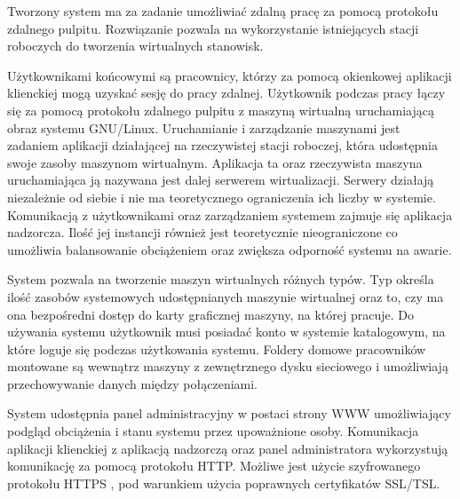 \documentclass[../wstep.tex]{subfiles}
\begin{document}
Tworzony system ma za zadanie umożliwiać zdalną pracę za pomocą protokołu zdalnego pulpitu. Rozwiązanie pozwala na wykorzystanie istniejących stacji roboczych do tworzenia wirtualnych stanowisk.

Użytkownikami końcowymi są pracownicy, którzy za pomocą okienkowej aplikacji klienckiej mogą uzyskać sesję do pracy zdalnej. Użytkownik podczas pracy łączy się za pomocą protokołu zdalnego pulpitu z maszyną wirtualną uruchamiającą obraz systemu GNU/Linux. Uruchamianie i zarządzanie maszynami jest zadaniem aplikacji działającej na rzeczywistej stacji roboczej, która udostępnia swoje zasoby maszynom wirtualnym. Aplikacja ta oraz rzeczywista maszyna uruchamiająca ją nazywana jest dalej serwerem wirtualizacji. Serwery działają niezależnie od siebie i nie ma teoretycznego ograniczenia ich liczby w systemie. Komunikacją z użytkownikami oraz zarządzaniem systemem zajmuje się aplikacja nadzorcza. Ilość jej instancji również jest teoretycznie nieograniczone co umożliwia balansowanie obciążeniem oraz zwiększa odporność systemu na awarie.

System pozwala na tworzenie maszyn wirtualnych różnych typów. Typ określa ilość zasobów systemowych udostępnianych maszynie wirtualnej oraz to, czy ma ona bezpośredni dostęp do karty graficznej maszyny, na której pracuje. Do używania systemu użytkownik musi posiadać konto w systemie katalogowym, na które loguje się podczas użytkowania systemu. Foldery domowe pracowników montowane są wewnątrz maszyny z zewnętrznego dysku sieciowego i umożliwiają przechowywanie danych między połączeniami.

System udostępnia panel administracyjny w postaci strony WWW umożliwiający podgląd obciążenia i stanu systemu przez upoważnione osoby. Komunikacja aplikacji klienckiej z aplikacją nadzorczą oraz panel administratora wykorzystują komunikację za pomocą protokołu HTTP. Możliwe jest użycie szyfrowanego protokołu HTTPS \parencite{rfc2818}, pod warunkiem użycia poprawnych certyfikatów SSL/TSL.
\end{document}

